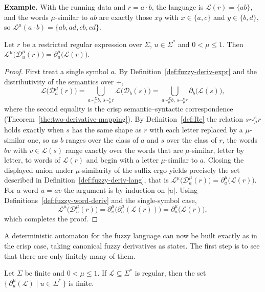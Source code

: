 \noindent\textbf{Example.} With the running data and $r=a\cdot b$, the language is
$\mathcal{L}(r)=\{ab\}$, and the words $\mu$-similar to $ab$ are exactly those $xy$
with $x\in\{a,c\}$ and $y\in\{b,d\}$, so
$\mathcal{L}^{\mu}(a\cdot b)=\{ab,ad,cb,cd\}$.

\begin{theorem}\label{the:fuzzy-correspondence}
Let $r$ be a restricted regular expression over $\Sigma$, $u\in\Sigma^{*}$ and
$0<\mu\le1$. Then
$\mathcal{L}^{\mu}\bigl(\mathcal{D}_u^{\mu}(r)\bigr)=\partial_u^{\mu}\bigl(\mathcal{L}(r)\bigr)$.
\end{theorem}

\begin{proof}
First treat a single symbol $a$. By Definition~\ref{def:fuzzy-deriv-expr} and the
distributivity of the semantics over $+$,
\[
\mathcal{L}\bigl(\mathcal{D}_a^{\mu}(r)\bigr)
= \bigcup_{a\sim_\mu^{\Sigma} b,\ s\sim_\mu^{e} r}\mathcal{L}\bigl(\mathcal{D}_b(s)\bigr)
= \bigcup_{a\sim_\mu^{\Sigma} b,\ s\sim_\mu^{e} r}\partial_b\bigl(\mathcal{L}(s)\bigr),
\]
where the second equality is the crisp semantic--syntactic correspondence
(Theorem~\ref{the:two-derivative-mapping}). By Definition~\ref{def:Re} the relation
$s\sim_\mu^{e} r$ holds exactly when $s$ has the same shape as $r$ with each letter
replaced by a $\mu$-similar one, so as $b$ ranges over the class of $a$ and $s$ over
the class of $r$, the words $bv$ with $v\in\mathcal{L}(s)$ range exactly over the
words that are $\mu$-similar, letter by letter, to words of $\mathcal{L}(r)$ and
begin with a letter $\mu$-similar to $a$. Closing the displayed union under
$\mu$-similarity of the suffix ergo yields precisely the set described in
Definition~\ref{def:fuzzy-deriv-lang}, that is
$\mathcal{L}^{\mu}\bigl(\mathcal{D}_a^{\mu}(r)\bigr)=\partial_a^{\mu}\bigl(\mathcal{L}(r)\bigr)$.
For a word $u=av$ the argument is by induction on $|u|$. Using
Definitions~\ref{def:fuzzy-word-deriv} and the single-symbol case,
\[
\mathcal{L}^{\mu}\bigl(\mathcal{D}_u^{\mu}(r)\bigr)
= \partial_v^{\mu}\bigl(\partial_a^{\mu}(\mathcal{L}(r))\bigr)
= \partial_u^{\mu}\bigl(\mathcal{L}(r)\bigr),
\]
which completes the proof.
\end{proof}

A deterministic automaton for the fuzzy language can now be built exactly as in the
crisp case, taking canonical fuzzy derivatives as states. The first step is to see
that there are only finitely many of them.

\begin{theorem}\label{the:fuzzy-finite}
Let $\Sigma$ be finite and $0<\mu\le1$. If $\mathcal{L}\subseteq\Sigma^{*}$ is
regular, then the set $\bigl\{\,\partial_u^{\mu}(\mathcal{L})\mid u\in\Sigma^{*}\,\bigr\}$
is finite.
\end{theorem}

